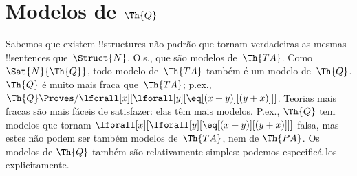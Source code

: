 \documentclass[../../../include/open-logic-section]{subfiles}
\begin{document}
\section{Modelos de $\Th{Q}$}

\begin{explain}
Sabemos que existem !!{structure}s não padrão que tornam verdadeiras
as mesmas !!{sentence}s que~$\Struct{N}$, O.s.\@, que são modelos
de~$\Th{TA}$. Como $\Sat{N}{\Th{Q}}$, todo modelo de~$\Th{TA}$ também
é um modelo de~$\Th{Q}$. $\Th{Q}$ é muito mais fraca que~$\Th{TA}$;
p.ex., $\Th{Q} \Proves/ \lforall[x][\lforall[y][\eq[(x +
      y)][(y+x)]]]$. Teorias mais fracas são mais fáceis de satisfazer:
elas têm mais modelos. P.ex., $\Th{Q}$ tem modelos que tornam
$\lforall[x][\lforall[y][\eq[(x + y)][(y+x)]]]$ falsa, mas estes não
podem ser também modelos de~$\Th{TA}$, nem de $\Th{PA}$. Os modelos de
$\Th{Q}$ também são relativamente simples: podemos especificá-los
explicitamente.
\end{explain}
\end{document}
